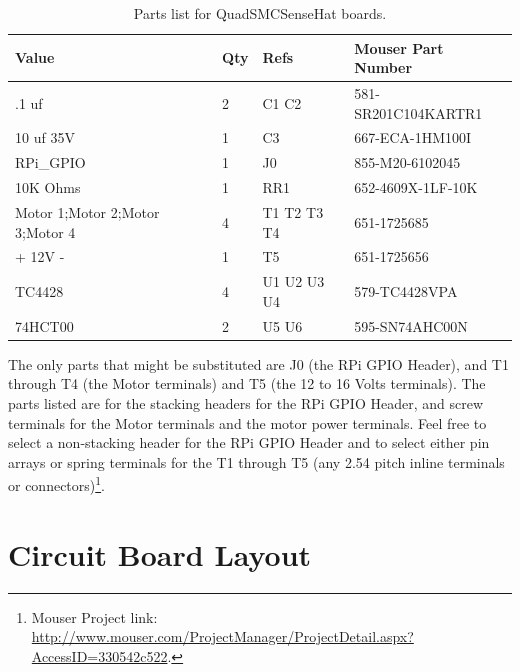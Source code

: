 \begin{table}[htdp]
\begin{centering}\begin{tabular}{|l|l|p{1in}|l|}
\hline
Value&Qty&Refs&Mouser Part Number \\
\hline
.1 uf&2&C1 C2&581-SR201C104KARTR1\\
\hline
10 uf 35V&1&C3&667-ECA-1HM100I\\
\hline
RPi\_GPIO&1&J0&855-M20-6102045\\
\hline
10K Ohms&1&RR1&652-4609X-1LF-10K\\
\hline
Motor 1;Motor 2;Motor 3;Motor 4&4&T1 T2 T3 T4&651-1725685\\
\hline
+ 12V -&1&T5&651-1725656\\
\hline
TC4428&4&U1 U2 U3 U4&579-TC4428VPA\\
\hline
74HCT00&2&U5 U6&595-SN74AHC00N\\
\hline
\end{tabular}
\caption{Parts list for QuadSMCSenseHat boards.}
\end{centering}\end{table}

The only parts that might be substituted are J0 (the RPi GPIO Header), and T1
through T4 (the Motor terminals) and T5 (the 12 to 16 Volts terminals). The
parts listed are for the stacking headers for the RPi GPIO Header, and screw
terminals for the Motor terminals and the motor power terminals. Feel free to
select a non-stacking header for the RPi GPIO Header and to select either pin
arrays or spring terminals for the T1 through T5 (any 2.54 pitch inline 
terminals or connectors)\footnote{Mouser Project link: 
\url{http://www.mouser.com/ProjectManager/ProjectDetail.aspx?AccessID=330542c522}.}.

\section{Circuit Board Layout}

